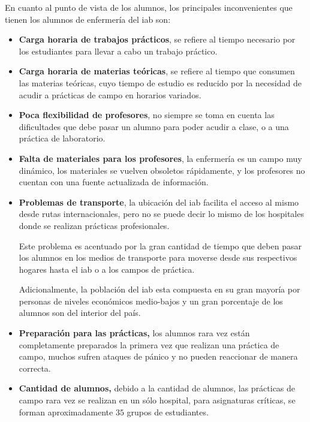 En cuanto al punto de vista de los alumnos, los principales inconvenientes que
tienen los alumnos de enfermería del \Gls{iab} son:

\begin{itemize}
    \item \textbf{Carga horaria de trabajos prácticos}, se refiere al tiempo necesario
        por los estudiantes para llevar a cabo un trabajo práctico\cite{iab:tesis_alumnos}.
        
    \item \textbf{Carga horaria de materias teóricas}, se refiere al tiempo que consumen
        las materias teóricas, cuyo tiempo de estudio es reducido por la
        necesidad de acudir a prácticas de campo en horarios
        variados\cite{iab:tesis_alumnos}.
        
    \item \textbf{Poca flexibilidad de profesores}, no siempre se toma en cuenta
        las dificultades que debe pasar un alumno para poder acudir a clase, o a
        una práctica de laboratorio\cite{iab:tesis_alumnos}.
        
    \item \textbf{Falta de materiales para los profesores}, la enfermería es un
        campo muy dinámico, los materiales se vuelven obsoletos rápidamente, y
        los profesores no cuentan con una fuente actualizada de
        información\cite{iab:tesis_alumnos}.
        
    \item \textbf{Problemas de transporte}, la ubicación del \Gls{iab} facilita el acceso al
        mismo desde rutas internacionales, pero no se puede decir lo mismo de
        los hospitales donde se realizan prácticas profesionales\cite{iab:tesis_alumnos}. 
        
        Este problema es acentuado por la gran cantidad de tiempo que deben pasar los alumnos
        en los medios de transporte para moverse desde sus respectivos hogares
        hasta el \Gls{iab} o a los campos de práctica\cite{iab:tesis_alumnos}.
        
        Adicionalmente, la población del \Gls{iab} esta compuesta en su gran mayoría por personas de
        niveles económicos medio-bajos y un gran porcentaje de los alumnos son del
        interior del país\cite{iab:tesis_alumnos}.
    
    \item \textbf{Preparación para las prácticas,} los alumnos rara vez están completamente preparados
        la primera vez que realizan una práctica de campo, muchos sufren ataques de pánico y
        no pueden reaccionar de manera correcta.
        
    \item \textbf{Cantidad de alumnos,} debido a la cantidad de alumnos, las 
        prácticas de campo rara vez se realizan en un sólo hospital, para asignaturas críticas, 
        se forman aproximadamente $35$ grupos de estudiantes.
\end{itemize}
